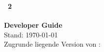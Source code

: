 \begin{titlepage}
	\vspace*{7cm}
	\begin{center}
    	\LARGE
		\textbf{\xirp~2\\\xirpname\\Developer Guide}\\
        \vspace{1cm}
        \large
        Stand: \today\\
		\vspace{1cm}
		\large
		Zugrunde liegende Version von \xirp: \version\\
	\end{center}
\end{titlepage}